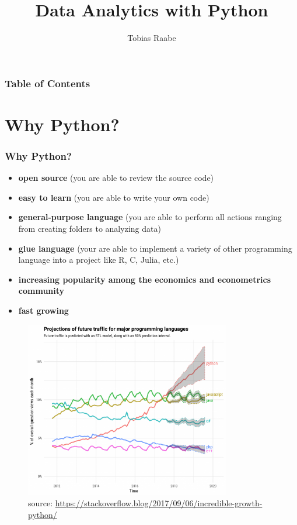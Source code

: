 


\title{Data Analytics with Python}
\author{Tobias Raabe}
\date{}
\let\otp\titlepage


\maketitle

\begin{frame}[c]\frametitle{Table of Contents}
\tableofcontents
\end{frame}

\section{Why Python?} %
\label{sec:why_python}

\begin{frame}[c]\frametitle{Why Python?}
\begin{itemize}
    \item \textbf{open source} (you are able to review the source code)
    \item \textbf{easy to learn} (you are able to write your own code)
    \item \textbf{general-purpose language} (you are able to perform all actions ranging from creating folders to analyzing data)
    \item \textbf{glue language} (your are able to implement a variety of other programming language into a project like R, C, Julia, etc.)
    \item \textbf{increasing popularity among the economics and econometrics community}
    \item \textbf{fast growing}
\end{itemize}
\end{frame}

\begin{frame}[c]
\begin{figure}[tb]
    \centering
    \includegraphics[width=0.8\textwidth, height=0.8\textheight]{../material/fig-python-growth}
    \caption{source: \url{https://stackoverflow.blog/2017/09/06/incredible-growth-python/}}
    \label{fig:python-growth}
\end{figure}
\end{frame}

